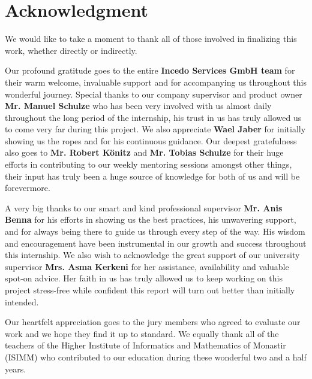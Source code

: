 \setcounter{page}{1}
\chapter*{Acknowledgment}

We would like to take a moment to thank all of those involved in finalizing this work, whether directly or indirectly.

Our profound gratitude goes to the entire \textbf{Incedo Services GmbH team} for their warm welcome, invaluable support and for accompanying us throughout this wonderful journey.
Special thanks to our company supervisor and product owner \textbf{Mr. Manuel Schulze} who has been very involved with us almost daily throughout the long period of the internship, his trust in us has truly allowed us to come very far during this project.
We also appreciate \textbf{Wael Jaber} for initially showing us the ropes and for his continuous guidance.
Our deepest gratefulness also goes to \textbf{Mr. Robert Könitz} and \textbf{Mr. Tobias Schulze} for their huge efforts in contributing to our weekly mentoring sessions amongst other things, their input has truly been a huge source of knowledge for both of us and will be forevermore.

A very big thanks to our smart and kind professional supervisor \textbf{Mr. Anis Benna} for his efforts in showing us the best practices, his unwavering support, and for always being there to guide us through every step of the way. His wisdom and encouragement have been instrumental in our growth and success throughout this internship.
We also wish to acknowledge the great support of our university supervisor \textbf{Mrs. Asma Kerkeni} for her assistance, availability and valuable spot-on advice.
Her faith in us has truly allowed us to keep working on this project stress-free while confident this report will turn out better than initially intended.

Our heartfelt appreciation goes to the jury members who agreed to evaluate
our work and we hope they find it up to standard. We equally thank all
of the teachers of the  Higher Institute of Informatics and Mathematics of Monastir (ISIMM) who contributed to our education during these wonderful two and
a half years.

\newpage
